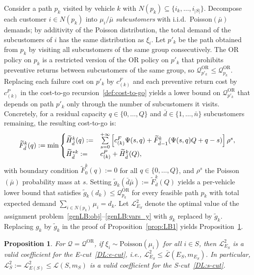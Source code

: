 \documentclass{article}
\newtheorem{proposition}{Proposition}
\newcommand{\rev}[1]{{\color{black}#1}}
\begin{document}
Consider a path $p_k$ visited by vehicle $k$ with $N(p_k) \subseteq \{i_k, \dots, i_{|S|}\}$. Decompose each customer $i \in N(p_k)$ into $\mu_i / \bar\mu$ \emph{subcustomers} with i.i.d.\ Poisson$(\bar\mu)$ demands; by additivity of the Poisson distribution, the total demand of the subcustomers of $i$ has the same distribution as $\xi_i$. Let $p'_k$ be the path obtained from $p_k$ by visiting all subcustomers of the same group consecutively. The OR policy on $p_k$ is a restricted version of the OR policy on $p'_k$ that prohibits preventive returns between subcustomers of the same group, so $\mathcal{Q}^{\mathrm{OR}}_{p'_k} \leq \mathcal{Q}^{\mathrm{OR}}_{p_k}$. Replacing each failure cost on $p'_k$ by $c^F_{(k)}$ and each preventive return cost by $c^P_{(k)}$ in the cost-to-go recursion~\eqref{def:cost-to-go} yields a lower bound on $\mathcal{Q}^{\mathrm{OR}}_{p'_k}$ that depends on path $p'_k$ only through the number of subcustomers it visits. Concretely, for a residual capacity $q \in \{0, \dots, Q\}$ and $\bar d \in \{1, \dots, \bar n\}$ subcustomers remaining, the resulting cost-to-go is:
\begin{equation}
\label{F_tilde_DP}
\hspace{-0.2cm}
\widetilde{F}^k_{\bar{d}}(q) := \min
\begin{cases}
\widetilde{H}^k_{\bar{d}}(q) := & \sum\limits_{s=0}^{+\infty} \left[ c^F_{(k)}\Psi(s,q) + \widetilde{F}^k_{\bar{d}-1}\!\left(\Psi(s,q)Q + q - s\right) \right] \rho^s, \\
\widetilde{H}^{*k}_{\bar{d}} := & c^P_{(k)} + \widetilde{H}^k_{\bar{d}}(Q),
\end{cases}\hspace{-0.19cm}
\end{equation}
with boundary condition $\widetilde{F}^k_0(q) := 0$ for all $q \in \{0, \dots, Q\}$, and $\rho^s$ the Poisson$(\bar\mu)$ probability mass at $s$. Setting $\widetilde{g}_k(\bar d \bar\mu) := \widetilde{F}^k_{\bar d}(Q)$ yields a per-vehicle lower bound that satisfies $\widetilde{g}_k(d_k) \leq \mathcal{Q}^{\mathrm{OR}}_{p_k}$ for every feasible path $p_k$ with total expected demand $\sum_{i \in N(p_k)} \mu_i = d_k$. Let $\mathcal{L}^2_{E_S}$ denote the optimal value of the assignment problem~\eqref{genLB:obj}--\eqref{genLB:vars_y} with $g_k$ replaced by $\widetilde{g}_k$. Replacing $g_k$ by $\widetilde{g}_k$ in the proof of Proposition~\ref{prop:LB1} yields Proposition~\ref{prop:LB2}.
 
\begin{proposition}\label{prop:LB2}
For $\mathcal{Q}=\mathcal{Q}^{\mathrm{OR}}$, if $\xi_i \sim \mathrm{Poisson}(\mu_i)$ for all $i \in S$, then $\mathcal{L}^2_{E_S}$ is a valid coefficient for the E-cut~\eqref{DL:e-cut}, i.e., $\mathcal{L}^2_{E_S} \leq \bar{\mathcal{L}}(E_S, m_{E_S})$. \rev{In particular, $\mathcal{L}^2_S := \mathcal{L}^2_{E(S)} \leq \mathcal{L}(S, m_S)$ is a valid coefficient for the S-cut~\eqref{DL:s-cut}.}
\end{proposition}
\end{document}
